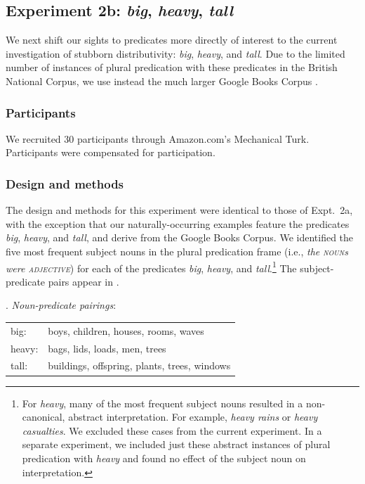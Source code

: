 \documentclass[linguex]{sp}
\begin{document}
\subsection{Experiment 2b: \emph{big}, \emph{heavy}, \emph{tall}}

We next shift our sights to predicates more directly of interest to the current investigation of stubborn distributivity: \emph{big}, \emph{heavy}, and \emph{tall}. Due to the limited number of instances of plural predication with these predicates in the British National Corpus, we use instead the much larger Google Books Corpus \citep{davies2011}.

\subsubsection{Participants}

We recruited 30 participants through Amazon.com's Mechanical Turk. Participants were compensated for participation.

\subsubsection{Design and methods}

The design and methods for this experiment were identical to those of Expt.~2a, with the exception that our naturally-occurring examples feature the predicates \emph{big}, \emph{heavy}, and \emph{tall}, and derive from the Google Books Corpus. We identified the five most frequent subject nouns in the plural predication frame (i.e., \emph{the \textsc{noun}s were \textsc{adjective}}) for each of the predicates \emph{big}, \emph{heavy}, and \emph{tall}.\footnote{For \emph{heavy}, many of the most frequent subject nouns resulted in a non-canonical, abstract interpretation. For example, \emph{heavy rains} or \emph{heavy casualties}. We excluded these cases from the current experiment. In a separate experiment, we included just these abstract instances of plural predication with \emph{heavy} and found no effect of the subject noun on interpretation.} The subject-predicate pairs appear in \Next.

\ex. \emph{Noun-predicate pairings}:\\[2pt]
\begin{tabular}{ll}
big:& boys, children, houses, rooms, waves\\
heavy:& bags, lids, loads, men, trees\\
tall:& buildings, offspring, plants, trees, windows
\end{tabular}	
\end{document}
